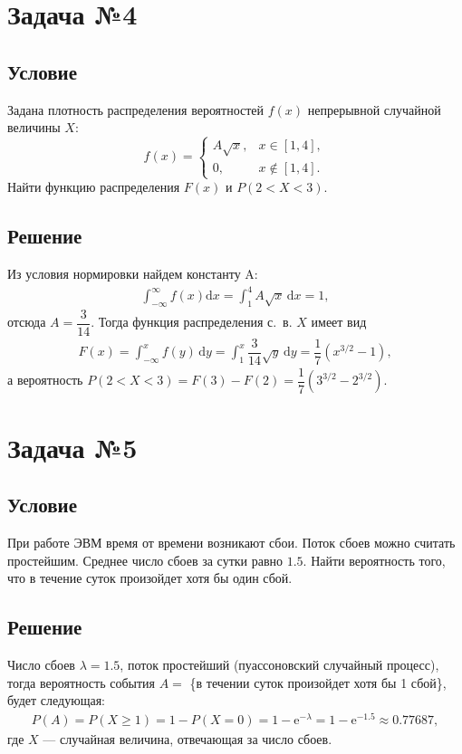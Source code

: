 \documentclass[12pt, a4paper]{article}
\begin{document}
			
			
		
	\newpage
	\section{Задача №4}
	
		\subsection*{Условие}
		Задана плотность распределения вероятностей $f(x)$ непрерывной случайной величины $X$:
		$$
			f(x) = 
			\begin{cases}
				A \sqrt{x}, & x \in [1, 4], \\
				0, & x \not \in [1, 4].
			\end{cases}
		$$		
		Найти функцию распределения $F(x)$ и $P(2 < X < 3)$.		
		
		\subsection*{Решение}
		
		Из условия нормировки найдем константу A: 
		\begin{gather*}
			\int_{-\infty}^{\infty} f(x) \mathrm{d} x = 
			\int_{1}^{4} A \sqrt{x} \, \mathrm{d} x = 1,
		\end{gather*}
		отсюда $A = \dfrac{3}{14}$. Тогда функция распределения с.~в. $X$ имеет вид
		\begin{gather*}
			F(x) = \int_{-\infty}^{x} f(y) \, \mathrm{d} y = 
			\int_{1}^{x} \dfrac{3}{14} \sqrt{y} \, \mathrm{d} y = 
			\dfrac{1}{7} \left(x^{3/2} - 1\right),
		\end{gather*}
		а вероятность $P(2 < X < 3) = F(3) - F(2) = \dfrac{1}{7} \left(3^{3/2} - 2^{3/2}\right)$.
		
		
	
	\newpage
	\section{Задача №5}
	
		\subsection*{Условие}	
		При работе ЭВМ время от времени возникают сбои. Поток сбоев можно считать
		простейшим.		
		Среднее число сбоев за сутки равно $1.5$.
		Найти вероятность того, что в течение суток произойдет хотя бы один сбой.	
				
		\subsection*{Решение}
		
		Число сбоев $\lambda = 1.5$, поток простейший (пуассоновский случайный процесс), тогда вероятность события $A = $ \{в течении суток произойдет хотя бы 1 сбой\}, будет следующая: 
		\begin{gather*}
			P(A) = P(X \geqslant 1) = 1 - P(X = 0) = 1 - \mathrm{e}^{-\lambda}
			= 1 - \mathrm{e}^{-1.5} \approx 0.77687,
		\end{gather*}
		где $X$ --- случайная величина, отвечающая за число сбоев.

		
		
		
	
\end{document}
